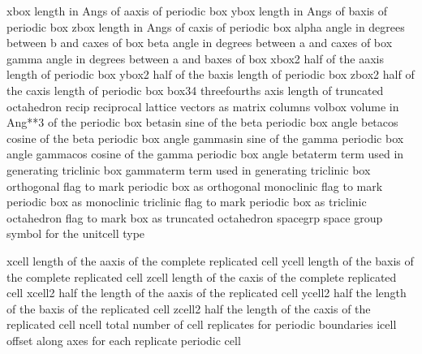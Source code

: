 \documentclass[letterpaper,11pt,english]{sphinxmanual}
\begin{document}
\begin{sphinxVerbatim}[commandchars=\\\{\}]
xbox            length in Angs of a\PYGZhy{}axis of periodic box
ybox            length in Angs of b\PYGZhy{}axis of periodic box
zbox            length in Angs of c\PYGZhy{}axis of periodic box
alpha           angle in degrees between b\PYGZhy{} and c\PYGZhy{}axes of box
beta            angle in degrees between a\PYGZhy{} and c\PYGZhy{}axes of box
gamma           angle in degrees between a\PYGZhy{} and b\PYGZhy{}axes of box
xbox2           half of the a\PYGZhy{}axis length of periodic box
ybox2           half of the b\PYGZhy{}axis length of periodic box
zbox2           half of the c\PYGZhy{}axis length of periodic box
box34           three\PYGZhy{}fourths axis length of truncated octahedron
recip           reciprocal lattice vectors as matrix columns
volbox          volume in Ang**3 of the periodic box
beta\PYGZus{}sin        sine of the beta periodic box angle
beta\PYGZus{}cos        cosine of the beta periodic box angle
gamma\PYGZus{}sin       sine of the gamma periodic box angle
gamma\PYGZus{}cos       cosine of the gamma periodic box angle
beta\PYGZus{}term       term used in generating triclinic box
gamma\PYGZus{}term      term used in generating triclinic box
orthogonal      flag to mark periodic box as orthogonal
monoclinic      flag to mark periodic box as monoclinic
triclinic       flag to mark periodic box as triclinic
octahedron      flag to mark box as truncated octahedron
spacegrp        space group symbol for the unitcell type
\end{sphinxVerbatim}


\begin{sphinxVerbatim}[commandchars=\\\{\}]
xcell           length of the a\PYGZhy{}axis of the complete replicated cell
ycell           length of the b\PYGZhy{}axis of the complete replicated cell
zcell           length of the c\PYGZhy{}axis of the complete replicated cell
xcell2          half the length of the a\PYGZhy{}axis of the replicated cell
ycell2          half the length of the b\PYGZhy{}axis of the replicated cell
zcell2          half the length of the c\PYGZhy{}axis of the replicated cell
ncell           total number of cell replicates for periodic boundaries
icell           offset along axes for each replicate periodic cell
\end{sphinxVerbatim}
\end{document}
